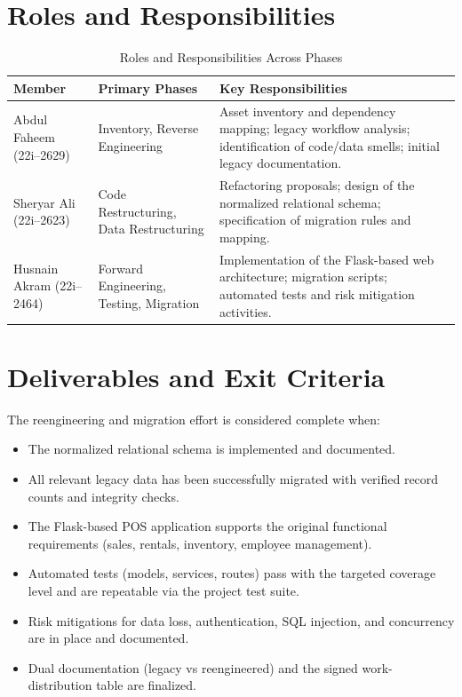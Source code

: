 \section{Roles and Responsibilities}

\begin{table}[h]
  \centering
  \caption{Roles and Responsibilities Across Phases}
  \begin{tabular}{p{4.5cm} p{3.2cm} p{5.0cm}}
    \toprule
    \textbf{Member} & \textbf{Primary Phases} & \textbf{Key Responsibilities} \\
    \midrule
    Abdul Faheem (22i--2629) &
      Inventory, Reverse Engineering &
      Asset inventory and dependency mapping; legacy workflow analysis;
      identification of code/data smells; initial legacy documentation. \\
    Sheryar Ali (22i--2623) &
      Code Restructuring, Data Restructuring &
      Refactoring proposals; design of the normalized relational schema;
      specification of migration rules and mapping. \\
    Husnain Akram (22i--2464) &
      Forward Engineering, Testing, Migration &
      Implementation of the Flask-based web architecture; migration scripts;
      automated tests and risk mitigation activities. \\
    \bottomrule
  \end{tabular}
\end{table}

\section{Deliverables and Exit Criteria}

The reengineering and migration effort is considered complete when:

\begin{itemize}
  \item The normalized relational schema is implemented and documented.
  \item All relevant legacy data has been successfully migrated with
        verified record counts and integrity checks.
  \item The Flask-based POS application supports the original functional
        requirements (sales, rentals, inventory, employee management).
  \item Automated tests (models, services, routes) pass with the targeted
        coverage level and are repeatable via the project test suite.
  \item Risk mitigations for data loss, authentication, SQL injection,
        and concurrency are in place and documented.
  \item Dual documentation (legacy vs reengineered) and the signed
        work-distribution table are finalized.
\end{itemize}
